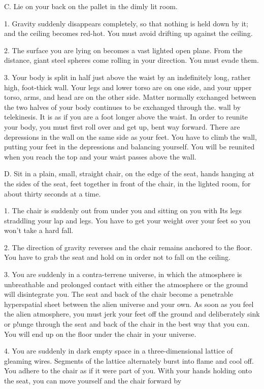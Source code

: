 \documentclass[10pt,twoside]{memoir}
\begin{document}
\begin{enumerate}
{\begin{enumerate}
\begin{sysrules}
\begin{sysrules}
\begin{sysrules}
\begin{sysrules}
{\begin{enumerate}
{{{{{{C. Lie on your back on the pallet in the dimly lit room. 

1. Gravity suddenly disappears completely, so that nothing is held down by 
it; and the ceiling becomes red-hot. You must avoid drifting up against the 
ceiling. 

2. The surface you are lying on becomes a vast lighted open plane. From the 
distance, giant steel spheres come rolling in your direction. You must evade 
them. 

3. Your body is split in half just above the waist by an indefinitely long, 
rather high, foot-thick wall. Your legs and lower torso are on one side, and 
your upper torso, arms, and head are on the other side. Matter normally 
exchanged between the two halves of your body continues to be exchanged 
through the. wall by telekinesis. It is as if you are a foot longer above the 
waist. In order to reunite your body, you must first roll over and get up, 
bent way forward. There are depressions in the wall on the same side as your 
feet. You have to climb the wall, putting your feet in the depressions and 
balancing yourself. You will be reunited when you reach the top and your 
waist passes above the wall. 

D. Sit in a plain, small, straight chair, on the edge of the seat, hands 
hanging at the sides of the seat, feet together in front of the chair, in the 
lighted room, for about thirty seconds at a time. 

1. The chair is suddenly out from under you and sitting on you with Its legs 
straddling your lap and legs. You have to get your weight over your feet so 
you won't take a hard fall. 

2. The direction of gravity reverses and the chair remains anchored to the 
floor. You have to grab the seat and hold on in order not to fall on the 
ceiling. 

3. You are suddenly in a contra-terrene universe, in which the atmosphere is 
unbreathable and prolonged contact with either the atmosphere or the 
ground will disintegrate you. The seat and back of the chair become a 
penetrable hyperspatial sheet between the alien universe and your own. As 
soon as you feel the alien atmosphere, you must jerk your feet off the 
ground and deliberately sink or p!unge through the seat and back of the chair 
in the best way that you can. You will end up on the floor under the chair in 
your universe. 

4. You are suddenly in dark empty space in a three-dimensional lattice of 
gleaming wires. Segments of the lattice alternately burst into flame and cool 
off. You adhere to the chair as if it were part of you. With your hands 
holding onto the seat, you can move yourself and the chair forward by 


}}}}}}
\end{enumerate}}
\end{sysrules}
\end{sysrules}
\end{sysrules}
\end{sysrules}
\end{enumerate}}
\end{enumerate}
\end{document}

